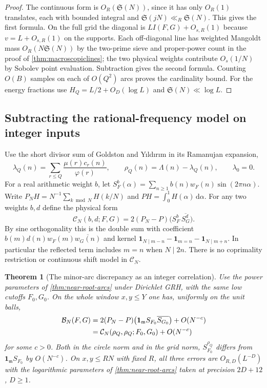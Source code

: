 \documentclass[11pt,a4paper]{article}
\numberwithin{equation}{section}
\newtheorem{theorem}{Theorem}[section]
\newcommand{\SSS}{\mathfrak S}
\newcommand{\ud}{\mathrm d}
\newcommand{\B}{\mathcal B_N}
\begin{document}
\begin{proof}
The continuous form is $O_R(\SSS(N))$, since it has only
$O_R(1)$ translates, each with bounded integral and
$\SSS(jN)\ll_R\SSS(N)$. This gives the first formula.
On the full grid the diagonal is $L I(F,G)+O_{s,R}(1)$
because $v=L+O_{s,R}(1)$ on the supports. Each off-diagonal
line has weighted Mangoldt mass $O_R(N\SSS(N))$ by the
two-prime sieve and proper-power count in the proof of
\cref{thm:macroscopiclines}; the two physical weights contribute
$O_s(1/N)$ by Sobolev point evaluation. Subtraction gives the
second formula. Counting $O(B)$ samples on each of $O(Q^2)$
arcs proves the cardinality bound. For the energy fractions use
$H_Q=L/2+O_D(\log L)$ and $\SSS(N)\ll\log L$.
\end{proof}

\subsection{Subtracting the rational-frequency model on integer inputs}

Use the short divisor sum of Goldston and Y{\i}ld{\i}r{\i}m
\cite[(1.1)]{GoldstonYildirimRamanujan} in its Ramanujan expansion,
\[
 \lambda_Q(n)=\sum_{r\le Q}\frac{\mu(r)c_r(n)}{\varphi(r)},\qquad
 \rho_Q(n)=\Lambda(n)-\lambda_Q(n),\qquad \lambda_0=0.
\]
For a real arithmetic weight $b$, let
$S_F^b(\alpha)=\sum_{n\ge1} b(n)w_F(n)\sin(2\pi n\alpha)$.
Write $P_N H=N^{-1}\sum_{k\bmod N}H(k/N)$ and
$P H=\int_0^1 H(\alpha)\,\ud\alpha$. For any two weights $b,d$
define the physical form
\[
 \mathcal C_N(b,d;F,G)
 =2(P_N-P)\big(S_F^b\,\overline{S_G^d}\big).
\]
By sine orthogonality this is the double sum with coefficient
$b(m)d(n)w_F(m)\overline{w_G(n)}$ and kernel
$\mathbf1_{N\mid m-n}-\mathbf1_{m=n}-\mathbf1_{N\mid m+n}$.
In particular the reflected term includes $m=n$ when $N\mid 2n$.
There is no coprimality restriction or continuous shift model in
$\mathcal C_N$.

\begin{theorem}[The minor-arc discrepancy as an integer correlation]
\label{thm:minor-residual-grid}
Use the power parameters of \cref{thm:near-root-arcs} under
Dirichlet GRH, with the same low cutoffs $F_0,G_0$. On the
whole window $x,y\le Y$ one has, uniformly on the unit balls,
\begin{align}
 \B(F,G)
 &=2(P_N-P)\big(\mathbf1_{\mathfrak m}S_{F_0}
                      \overline{S_{G_0}}\big)+O(N^{-c})\notag\\
 &=\mathcal C_N(\rho_Q,\rho_Q;F_0,G_0)+O(N^{-c})
 \label{eq:minor-residual-physical}
\end{align}
for some $c>0$. Both in the circle norm and in the grid norm,
$S^{\rho_Q}_{F_0}$ differs from $\mathbf1_{\mathfrak m}S_{F_0}$
by $O(N^{-c})$. On $x,y\le RN$ with fixed $R$, all three
errors are $O_{R,D}(L^{-D})$ with the logarithmic parameters of
\cref{thm:near-root-arcs} taken at precision $2D+12$, $D\ge1$.
\end{theorem}
\end{document}
